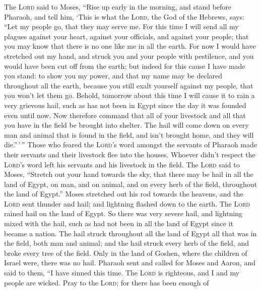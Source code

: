  The \textsc{Lord} said to Moses, ``Rise up early in the
morning, and stand before Pharaoh, and tell him, `This is what the
\textsc{Lord}, the God of the Hebrews, says: ``Let my people go, that
they may serve me.  For this time I will send all my
plagues against your heart, against your officials, and against your
people; that you may know that there is no one like me in all the earth.
 For now I would have stretched out my hand, and struck
you and your people with pestilence, and you would have been cut off
from the earth;  but indeed for this cause I have made
you stand: to show you my power, and that my name may be declared
throughout all the earth,  because you still exalt
yourself against my people, that you won't let them go. 
Behold, tomorrow about this time I will cause it to rain a very grievous
hail, such as has not been in Egypt since the day it was founded even
until now.  Now therefore command that all of your
livestock and all that you have in the field be brought into shelter.
The hail will come down on every man and animal that is found in the
field, and isn't brought home, and they will die.''\,'\,''
 Those who feared the \textsc{Lord}'s word amongst the
servants of Pharaoh made their servants and their livestock flee into
the houses.  Whoever didn't respect the \textsc{Lord}'s
word left his servants and his livestock in the field. 
The \textsc{Lord} said to Moses, ``Stretch out your hand towards the
sky, that there may be hail in all the land of Egypt, on man, and on
animal, and on every herb of the field, throughout the land of Egypt.''
 Moses stretched out his rod towards the heavens, and the
\textsc{Lord} sent thunder and hail; and lightning flashed down to the
earth. The \textsc{Lord} rained hail on the land of Egypt.
 So there was very severe hail, and lightning mixed with
the hail, such as had not been in all the land of Egypt since it became
a nation.  The hail struck throughout all the land of
Egypt all that was in the field, both man and animal; and the hail
struck every herb of the field, and broke every tree of the field.
 Only in the land of Goshen, where the children of Israel
were, there was no hail.  Pharaoh sent and called for
Moses and Aaron, and said to them, ``I have sinned this time. The
\textsc{Lord} is righteous, and I and my people are wicked.
 Pray to the \textsc{Lord}; for there has been enough of
